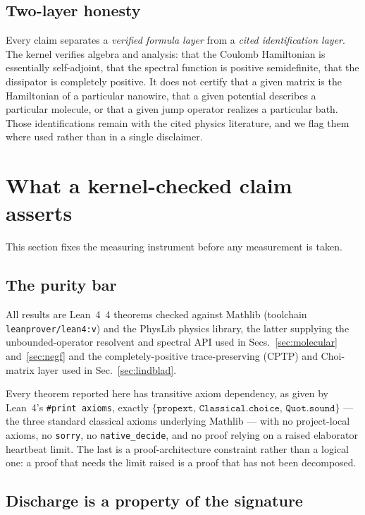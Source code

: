 \documentclass[aps,prd,reprint,nofootinbib,superscriptaddress]{revtex4-2}
\newcommand{\Lean}{Lean~4}
\begin{document}
\subsection{Two-layer honesty}

Every claim separates a \emph{verified formula layer} from a \emph{cited identification layer}. The
kernel verifies algebra and analysis: that the Coulomb Hamiltonian is essentially self-adjoint, that
the spectral function is positive semidefinite, that the dissipator is completely positive. It does
not certify that a given matrix is the Hamiltonian of a particular nanowire, that a given potential
describes a particular molecule, or that a given jump operator realizes a particular bath. Those
identifications remain with the cited physics literature, and we flag them where used rather than in
a single disclaimer.

\section{What a kernel-checked claim asserts}
\label{sec:framework}

This section fixes the measuring instrument before any measurement is taken.

\subsection{The purity bar}

All results are \Lean{}~4 theorems checked against Mathlib (toolchain
\texttt{leanprover/lean4:v\leantoolchain}) and the PhysLib physics library, the latter supplying the
unbounded-operator resolvent and spectral API used in Secs.~\ref{sec:molecular} and~\ref{sec:negf}
and the completely-positive trace-preserving (CPTP) and Choi-matrix layer used in
Sec.~\ref{sec:lindblad}.

Every theorem reported here has transitive axiom dependency, as given by \Lean{}'s
\texttt{\#print axioms}, exactly $\{\texttt{propext},\,\texttt{Classical.choice},\,
\texttt{Quot.sound}\}$ --- the three standard classical axioms underlying Mathlib --- with no
project-local axioms, no \texttt{sorry}, no \texttt{native\_decide}, and no proof relying on a raised
elaborator heartbeat limit. The last is a proof-architecture constraint rather than a logical one: a
proof that needs the limit raised is a proof that has not been decomposed.

\subsection{Discharge is a property of the signature}
\end{document}
